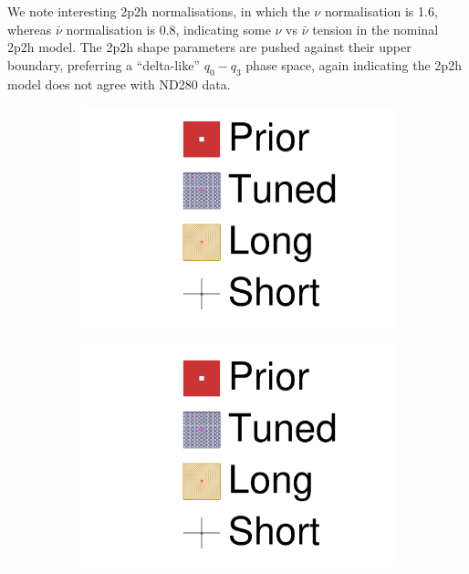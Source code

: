 We note interesting 2p2h normalisations, in which the $\nu$ normalisation is 1.6, whereas $\bar{\nu}$ normalisation is 0.8, indicating some $\nu$ vs $\bar{\nu}$ tension in the nominal 2p2h model. The 2p2h shape parameters are pushed against their upper boundary, preferring a ``delta-like'' $q_0-q_3$ phase space, again indicating the 2p2h model does not agree with ND280 data.
\begin{figure}[h]
	\begin{subfigure}[t]{0.1\textwidth}
		\includegraphics[width=\textwidth, trim={0mm 150mm 50mm 0mm}, clip,page=1]{figures/mach3/data/2017b_NewData_NewDet_UpdXsecStep_2Xsec_4Det_5Flux_0_2017b_June_NewDet_merge_2017b_NewDet_June_Long_0}
	\end{subfigure}
	\begin{subfigure}[t]{0.1\textwidth}
		\includegraphics[width=\textwidth, trim={0mm 100mm 50mm 50mm}, clip,page=1]{figures/mach3/data/2017b_NewData_NewDet_UpdXsecStep_2Xsec_4Det_5Flux_0_2017b_June_NewDet_merge_2017b_NewDet_June_Long_0}

\end{subfigure}
\end{figure}
